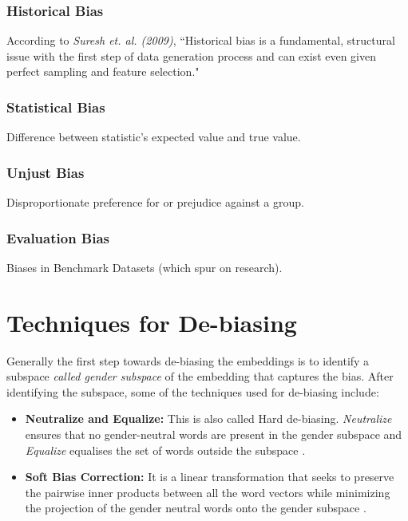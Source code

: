 \documentclass[12pt, a4paper]{article}
\begin{document}
			\subsubsection{Historical Bias}
				According to \emph{Suresh et. al. (2009)}, ``Historical bias is a fundamental, structural issue with the first step of data generation process and can exist even given perfect sampling and feature selection."
			\subsubsection{Statistical Bias}
				Difference between statistic's expected value and true value.
			\subsubsection{Unjust Bias}
				Disproportionate preference for or prejudice against a group.
			\subsubsection{Evaluation Bias}
				Biases in Benchmark Datasets (which spur on research).		
	
	\section{Techniques for De-biasing}
		Generally the first step towards de-biasing the embeddings is to identify a subspace \emph{called gender subspace} of the embedding that captures the bias\cite{1}. After identifying the subspace, some of the techniques used for de-biasing include:
		\begin{itemize}
			\item \textbf{Neutralize and Equalize:} This is also called Hard de-biasing. \emph{Neutralize} ensures that no gender-neutral words are present in the gender subspace and \emph{Equalize} equalises the set of words outside the subspace \cite{1}.
			\item \textbf{Soft Bias Correction:} It is a linear transformation that seeks to preserve the pairwise inner products between all the word vectors while minimizing the projection of the gender neutral words onto the gender subspace \cite{1}.
		\end{itemize}
		
	
\end{document}
